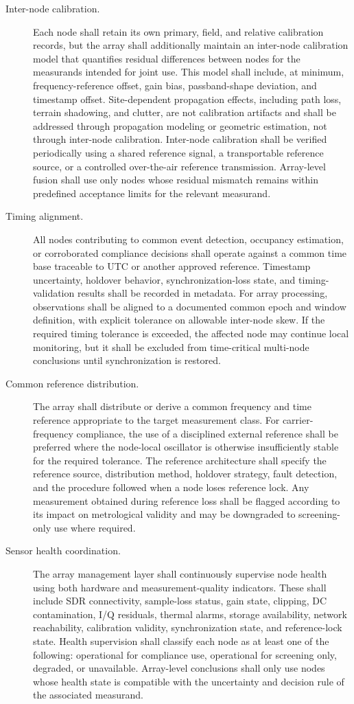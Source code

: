 \documentclass[11pt]{report}
\begin{document}
\begin{description}
	\item[Inter-node calibration.] Each node shall retain its own primary, field, and relative calibration records, but the array shall additionally maintain an inter-node calibration model that quantifies residual differences between nodes for the measurands intended for joint use. This model shall include, at minimum, frequency-reference offset, gain bias, passband-shape deviation, and timestamp offset. Site-dependent propagation effects, including path loss, terrain shadowing, and clutter, are not calibration artifacts and shall be addressed through propagation modeling or geometric estimation, not through inter-node calibration. Inter-node calibration shall be verified periodically using a shared reference signal, a transportable reference source, or a controlled over-the-air reference transmission. Array-level fusion shall use only nodes whose residual mismatch remains within predefined acceptance limits for the relevant measurand.
	\item[Timing alignment.] All nodes contributing to common event detection, occupancy estimation, or corroborated compliance decisions shall operate against a common time base traceable to UTC or another approved reference. Timestamp uncertainty, holdover behavior, synchronization-loss state, and timing-validation results shall be recorded in metadata. For array processing, observations shall be aligned to a documented common epoch and window definition, with explicit tolerance on allowable inter-node skew. If the required timing tolerance is exceeded, the affected node may continue local monitoring, but it shall be excluded from time-critical multi-node conclusions until synchronization is restored.
	\item[Common reference distribution.] The array shall distribute or derive a common frequency and time reference appropriate to the target measurement class. For carrier-frequency compliance, the use of a disciplined external reference shall be preferred where the node-local oscillator is otherwise insufficiently stable for the required tolerance. The reference architecture shall specify the reference source, distribution method, holdover strategy, fault detection, and the procedure followed when a node loses reference lock. Any measurement obtained during reference loss shall be flagged according to its impact on metrological validity and may be downgraded to screening-only use where required.
	\item[Sensor health coordination.] The array management layer shall continuously supervise node health using both hardware and measurement-quality indicators. These shall include SDR connectivity, sample-loss status, gain state, clipping, DC contamination, I/Q residuals, thermal alarms, storage availability, network reachability, calibration validity, synchronization state, and reference-lock state. Health supervision shall classify each node as at least one of the following: operational for compliance use, operational for screening only, degraded, or unavailable. Array-level conclusions shall only use nodes whose health state is compatible with the uncertainty and decision rule of the associated measurand.

\end{description}
\end{document}
